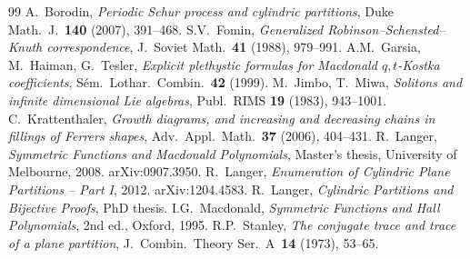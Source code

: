 \documentclass[11pt]{article}
\theoremstyle{plain}
\theoremstyle{definition}
\begin{document}
\begin{thebibliography}{99}
 A.~Borodin, \emph{Periodic Schur process and cylindric partitions}, Duke Math.~J.~\textbf{140} (2007), 391--468.
 S.V.~Fomin, \emph{Generalized Robinson--Schensted--Knuth correspondence}, J.~Soviet Math.~\textbf{41} (1988), 979--991.
 A.M.~Garsia, M.~Haiman, G.~Tesler, \emph{Explicit plethystic formulas for Macdonald $q,t$-Kostka coefficients}, S\'em.\ Lothar.\ Combin.~\textbf{42} (1999).
 M.~Jimbo, T.~Miwa, \emph{Solitons and infinite dimensional Lie algebras}, Publ.\ RIMS \textbf{19} (1983), 943--1001.
 C.~Krattenthaler, \emph{Growth diagrams, and increasing and decreasing chains in fillings of Ferrers shapes}, Adv.\ Appl.\ Math.\ \textbf{37} (2006), 404--431.
 R.~Langer, \emph{Symmetric Functions and Macdonald Polynomials}, Master's thesis, University of Melbourne, 2008. arXiv:0907.3950.
 R.~Langer, \emph{Enumeration of Cylindric Plane Partitions -- Part I}, 2012. arXiv:1204.4583.
 R.~Langer, \emph{Cylindric Partitions and Bijective Proofs}, PhD thesis.
 I.G.~Macdonald, \emph{Symmetric Functions and Hall Polynomials}, 2nd ed., Oxford, 1995.
 R.P.~Stanley, \emph{The conjugate trace and trace of a plane partition}, J.~Combin.\ Theory Ser.~A~\textbf{14} (1973), 53--65.
\end{thebibliography}
\end{document}
